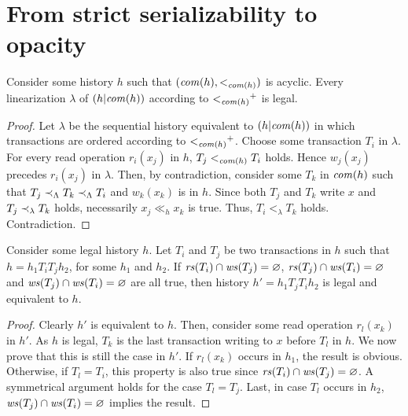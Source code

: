 \section{From strict serializability to opacity}



\begin{lemma}
  Consider some history $h$ such that $(\committed{h},<_{\committed{h}})$ is acyclic.
  Every linearization $\lambda$ of $(h|\committed{h})$ according to $\closureOf{<_{\committed{h}}}$ is legal.  
\end{lemma}

\begin{proof}
  Let $\lambda$ be the sequential history equivalent to $(h|\committed{h})$ in which transactions are ordered according to $\closureOf{<_{\committed{h}}}$.
  Choose some transaction $T_i$ in $\lambda$.
  For every read operation $r_i(x_j)$ in $h$, $T_j <_{\committed{h}} T_i$ holds.
  Hence $w_j(x_j)$ precedes $r_i(x_j)$ in $\lambda$.
  Then, by contradiction, consider some $T_k$ in $\committed{h}$ such that $T_j \hb_{\Lambda} T_k \hb_{\Lambda} T_i$ and $w_k(x_k)$ is in $h$.
  Since both $T_j$ and $T_k$ write $x$ and $T_j \hb_{\lambda} T_k$ holds, necessarily $x_j \ll_h x_k$ is true.
  Thus, $T_i <_{\lambda} T_k$ holds.
  Contradiction.
\end{proof}

\begin{lemma}
  Consider some legal history $h$.
  Let $T_i$ and $T_j$ be two transactions in $h$ such that $h = h_1 T_i T_j h_2$, for some $h_1$ and $h_2$.
  If $\readSetOf{T_i} \inter \writeSetOf{T_j} = \emptySet$, $\readSetOf{T_j} \inter \writeSetOf{T_i} = \emptySet$ and $\writeSetOf{T_j} \inter \writeSetOf{T_i} = \emptySet$ are all true, then history $h' = h_1 T_j T_i h_2$ is legal and equivalent to $h$.
\end{lemma}

\begin{proof}
  Clearly $h'$ is equivalent to $h$.
  Then, consider some read operation $r_l(x_k)$ in $h'$.
  As $h$ is legal, $T_k$ is the last transaction writing to $x$ before $T_l$ in $h$.
  We now prove that this is still the case in $h'$.  
  If $r_l(x_k)$ occurs in $h_1$, the result is obvious.
  Otherwise, if $T_l = T_i$, this property is also true since $\readSetOf{T_i} \inter \writeSetOf{T_j} = \emptySet$.
  A symmetrical argument holds for the case $T_l = T_j$.
  Last, in case $T_l$ occurs in $h_2$, $\writeSetOf{T_j} \inter \writeSetOf{T_i} = \emptySet$ implies the result.
\end{proof}

